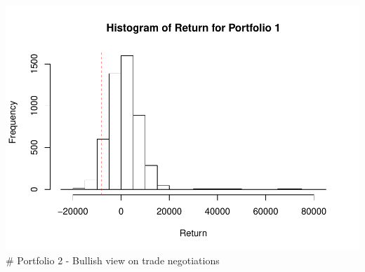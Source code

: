 \documentclass[]{article}
\begin{document}
\includegraphics{STA380_exercise_George_files/figure-latex/unnamed-chunk-15-1.pdf}
\# Portfolio 2 - Bullish view on trade negotiations
\end{document}
